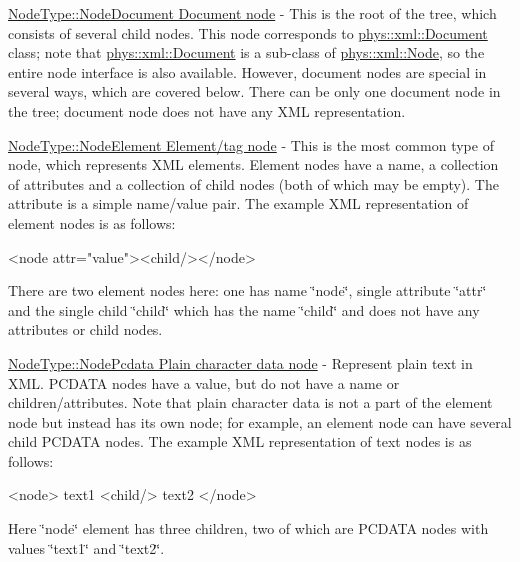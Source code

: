 \begin{DoxyItemize}
\item \hyperlink{namespacephys_1_1xml_a668b0cc666a9d49f7c7222a7552115d3}{NodeType::NodeDocument Document node} -\/ This is the root of the tree, which consists of several child nodes. This node corresponds to \hyperlink{classphys_1_1xml_1_1Document}{phys::xml::Document} class; note that \hyperlink{classphys_1_1xml_1_1Document}{phys::xml::Document} is a sub-\/class of \hyperlink{classphys_1_1xml_1_1Node}{phys::xml::Node}, so the entire node interface is also available. However, document nodes are special in several ways, which are covered below. There can be only one document node in the tree; document node does not have any XML representation. \par

\item \hyperlink{namespacephys_1_1xml_a668b0cc666a9d49f7c7222a7552115d3}{NodeType::NodeElement Element/tag node} -\/ This is the most common type of node, which represents XML elements. Element nodes have a name, a collection of attributes and a collection of child nodes (both of which may be empty). The attribute is a simple name/value pair. The example XML representation of element nodes is as follows: 
\begin{DoxyCode}
 <node attr="value"><child/></node> 
\end{DoxyCode}
 There are two element nodes here: one has name \char`\"{}node\char`\"{}, single attribute \char`\"{}attr\char`\"{} and the single child \char`\"{}child\char`\"{} which has the name \char`\"{}child\char`\"{} and does not have any attributes or child nodes. \par

\item \hyperlink{namespacephys_1_1xml_a668b0cc666a9d49f7c7222a7552115d3}{NodeType::NodePcdata Plain character data node} -\/ Represent plain text in XML. PCDATA nodes have a value, but do not have a name or children/attributes. Note that plain character data is not a part of the element node but instead has its own node; for example, an element node can have several child PCDATA nodes. The example XML representation of text nodes is as follows: 
\begin{DoxyCode}
 <node> text1 <child/> text2 </node> 
\end{DoxyCode}
 Here \char`\"{}node\char`\"{} element has three children, two of which are PCDATA nodes with values \char`\"{}text1\char`\"{} and \char`\"{}text2\char`\"{}. \par


\end{DoxyItemize}
